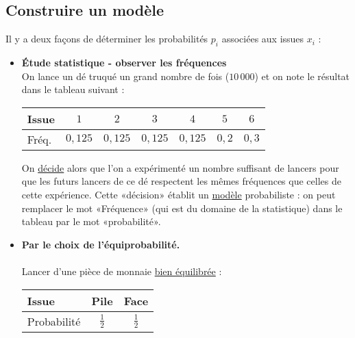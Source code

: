 \documentclass[a4paper,11pt]{article} \usepackage{FBarticle} \mapage{831}{Probabilités 1} %
\begin{document}
\begin{multicols}{2}

\subsection{Construire un modèle}
Il y a deux façons de déterminer les probabilités $p_i$ associées aux issues $x_i$ :\par
\begin{itemize}
\item \textbf{Étude statistique - observer les fréquences}\\
\exem On lance un dé truqué un grand nombre de fois ($10\,000$) et on note le résultat dans le tableau suivant :\\
\begin{tabular}{|l|c|c|c|c|c|c|}\hline
Issue      & $1$ & $2$ & $3$ & $4$ & $5$ & $6$ \\ \hline
Fréq.& $0,125$ & $0,125$ & $0,125$ & $0,125$ & $0,2$ & $0,3$ \\ \hline
\end{tabular}
On \underline{décide} alors que l'on a expérimenté un nombre suffisant de lancers pour que les futurs lancers de ce dé respectent les mêmes fréquences que celles de cette expérience. Cette «décision» établit un \underline{modèle} probabiliste : on peut remplacer le mot «Fréquence» (qui est du domaine de la statistique) dans le tableau par le mot «probabilité».\\

\item \textbf{Par le choix de l'équiprobabilité.}\\
\\
\exem Lancer d'une pièce de monnaie \underline{bien équilibrée} :\\
\begin{tabular}{|l||c|c|} \hline
Issue & Pile & Face \\ \hline
Probabilité& $\frac{1}{2}$ & $\frac{1}{2}$ \\ \hline
\end{tabular}


\end{itemize}
\end{multicols}
\end{document}
